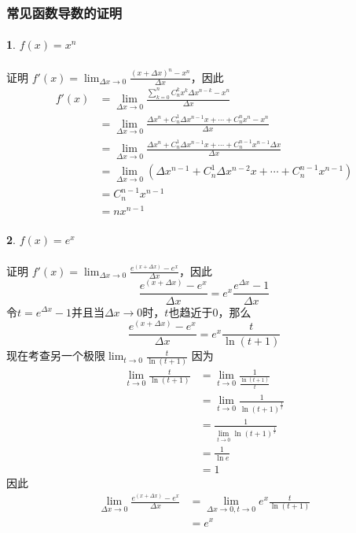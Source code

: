 \subsubsection{常见函数导数的证明}
\paragraph{}
\textbf{1}. $f(x) = x^n$

\paragraph{}
证明\: $f'(x) = \lim_{\Delta x \to 0} \frac{(x + \Delta x)^n - x^n}{\Delta x}$，因此
\begin{align*}
f'(x) & = \lim_{\Delta x \to 0}  \frac{\sum_{k = 0}^n C_n^k x^k \Delta x^{n-k} - x^n}{\Delta x} \\
& =  \lim_{\Delta x \to 0}  \frac{\Delta x^n + C_n^1 \Delta x^{n-1} x + \cdots + C_n^n x^n - x^n }{\Delta x} \\
& = \lim_{\Delta x \to 0}  \frac{\Delta x^n + C_n^1 \Delta x^{n-1} x + \cdots + C_n^{n-1} x^{n-1} \Delta x }{\Delta x} \\
&= \lim_{\Delta x \to 0} ( \Delta x^{n-1} + C_n^1 \Delta x^{n-2} x + \cdots + C_n^{n-1} x^{n-1}) \\
&= C_n^{n-1} x^{n-1} \\
&= n x^{n-1}
\end{align*}

\paragraph{}
\textbf{2}. $f(x) = e^x$

\paragraph{}
证明\: $f'(x) = \lim_{\Delta x \to 0} \frac{e^{(x + \Delta x)} - e^x}{\Delta x}$，因此
$$
 \frac{e^{(x + \Delta x)} - e^x}{\Delta x} = e^x \frac{e^{\Delta x} - 1}{\Delta x}
$$
令$t = e^{\Delta x} - 1$并且当$\Delta x \to 0$时，$t$也趋近于$0$，那么
$$
 \frac{e^{(x + \Delta x)} - e^x}{\Delta x} = e^x \frac{t}{\ln{(t + 1)}}
$$
现在考查另一个极限$\lim_{t \to 0} \frac{t}{\ln{(t+1)}}$
因为
\begin{align*}
\lim_{t \to 0} \frac{t}{\ln{(t+1)}} & = \lim_{t \to 0} \frac{1}{\frac{\ln{(t+1)}}{t}} \\
& = \lim_{t \to 0} \frac{1}{\ln{(t + 1)^{\frac{1}{t}}}} \\
& = \frac{1}{ \lim_{t \to 0} \ln{(t + 1)^{\frac{1}{t}}} } \\
& = \frac{1}{\ln{e}} \\
& = 1
\end{align*}
因此
\begin{align*}
\lim_{\Delta x \to 0}  \frac{e^{(x + \Delta x)} - e^x}{\Delta x} & = \lim_{\Delta x \to 0, t \to 0} e^x \frac{t}{\ln{(t + 1)}} \\
& = e^x
\end{align*}


